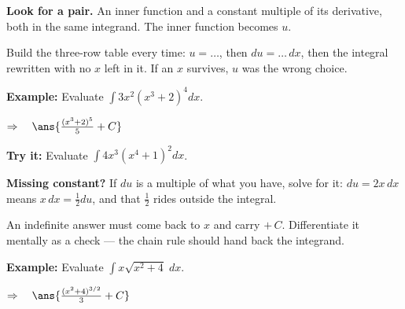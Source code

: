 \documentclass[12pt]{article}
\begin{document}


\begin{formulabox}
\textbf{Look for a pair.} An inner function and a constant multiple of its
derivative, both in the same integrand. The inner function becomes $u$.\par
Build the three-row table every time: $u = \ldots$, then
$du = \ldots\,dx$, then the integral rewritten with no $x$ left in it. If an $x$
survives, $u$ was the wrong choice.
\end{formulabox}

\begin{examplebox}
\textbf{Example:} \quad Evaluate $\displaystyle\int 3x^2\left(x^3+2\right)^4dx$.

$\Rightarrow\quad \ans{\tfrac{(x^3+2)^5}{5} + C}$
\end{examplebox}

\begin{tryitbox}
\textbf{Try it:} \quad Evaluate $\displaystyle\int 4x^3\left(x^4+1\right)^2dx$.\\[2pt]
\end{tryitbox}


\begin{formulabox}
\textbf{Missing constant?} If $du$ is a multiple of what you have, solve for it:
$du = 2x\,dx$ means $x\,dx = \tfrac{1}{2}du$, and that $\tfrac{1}{2}$ rides
outside the integral.\par
An indefinite answer must come back to $x$ and carry $+\,C$. Differentiate it
mentally as a check --- the chain rule should hand back the integrand.
\end{formulabox}

\begin{examplebox}
\textbf{Example:} \quad Evaluate $\displaystyle\int x\sqrt{x^2+4}\;dx$.

$\Rightarrow\quad \ans{\tfrac{(x^2+4)^{3/2}}{3} + C}$
\end{examplebox}
\end{document}
